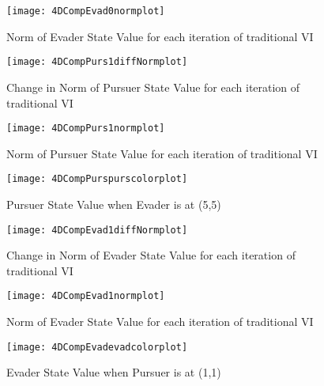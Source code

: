 \begin{figure}
\vspace{2.4in}
\centering
\texttt{[image: 4DCompEvad0normplot]}
\caption{Norm of Evader State Value for each iteration of traditional VI}
\label{4DCompEvad0normplot}
\end{figure}
\clearpage
\newpage

\begin{figure}
\vspace{2.4in}
\centering
\texttt{[image: 4DCompPurs1diffNormplot]}
\caption{Change in Norm of Pursuer State Value for each iteration of traditional VI}
\label{4DCompPurs1diffNormplot}
\end{figure}
\clearpage
\newpage

\begin{figure}
\vspace{2.4in}
\centering
\texttt{[image: 4DCompPurs1normplot]}
\caption{Norm of Pursuer State Value for each iteration of traditional VI}
\label{4DCompPurs1normplot}
\end{figure}
\clearpage
\newpage

\begin{figure}
\vspace{2.4in}
\centering
\texttt{[image: 4DCompPurspurscolorplot]}
\caption{Pursuer State Value when Evader is at (5,5)}
\label{4DCompPurspurscolorplot}
\end{figure}
\clearpage
\newpage

\begin{figure}
\vspace{2.4in}
\centering
\texttt{[image: 4DCompEvad1diffNormplot]}
\caption{Change in Norm of Evader State Value for each iteration of traditional VI}
\label{4DCompEvad1diffNormplot}
\end{figure}
\clearpage
\newpage

\begin{figure}
\vspace{2.4in}
\centering
\texttt{[image: 4DCompEvad1normplot]}
\caption{Norm of Evader State Value for each iteration of traditional VI}
\label{4DCompEvad1normplot}
\end{figure}
\clearpage
\newpage

\begin{figure}
\vspace{2.4in}
\centering
\texttt{[image: 4DCompEvadevadcolorplot]}
\caption{Evader State Value when Pursuer is at (1,1)}
\label{4DCompEvadevadcolorplot}
\end{figure}
\clearpage
\newpage

